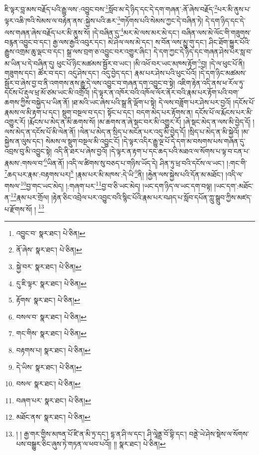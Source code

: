ཇི་ལྟར་བླ་མས་བརྗོད་པའི་རྒྱུ་ལས་:འབྱུང་བས་\footnote{འབྱུང་བ་  སྣར་ཐང་།  པེ་ཅིན། }སློབ་མ་དེ་ཉིད་དང་དེ་དག་གཞན་:ནོ་ཞེས་བརྗོད་\footnote{ནོ་ཞེས་  སྣར་ཐང་།  པེ་ཅིན། }པར་མི་ནུས་པ་ལྟར་འཆི་ཁའི་སེམས་ལ་བརྟེན་ནས་:སྐྱེས་པའི་ཆར་\footnote{སྐྱེ་བར་  སྣར་ཐང་།  པེ་ཅིན། }གཏོགས་པའི་སེམས་ཀྱང་དེ་བཞིན་ཏེ། དེ་དག་ཉིད་དང་དེ་ལས་གཞན་ཞེས་བརྗོད་པར་མི་ནུས་སོ། །དེ་བཞིན་དུ་\footnote{དུ་ཇི་ལྟར་  སྣར་ཐང་།  པེ་ཅིན། }མར་མེ་ལས་མར་མེ་དང་། བཞིན་ལས་མེ་ལོང་གི་གཟུགས་བརྙན་འབྱུང་བ་དང་། རྒྱ་ལས་རྒྱའི་འབུར་དང་། མེ་ཤེལ་ལས་མེ་དང་། ས་བོན་ལས་མྱུ་གུ་དང་། ཤིང་ཐོག་སྐྱུར་པོའི་རྒྱུས་འགྲམ་ཆུ་ལྡང་བ་དང་། སྒྲ་ལས་བྲག་ཅ་འབྱུང་བར་འགྱུར་ཞིང་། དེ་དག་ཀྱང་དེ་ཉིད་དང་གཞན་ཤེས་པར་སླ་བ་མ་ཡིན་པ་དེ་བཞིན་དུ། ཕུང་པོ་ཉིང་མཚམས་སྦྱོར་བ་ཡང་། །མི་འཕོ་བར་ཡང་མཁས་རྟོག་\footnote{རྟོགས་  སྣར་ཐང་།  པེ་ཅིན། }བྱ། །དེ་ལ་ཕུང་པོ་ནི། གཟུགས་དང་། ཚོར་བ་དང་། འདུ་ཤེས་དང་། འདུ་བྱེད་དང་། རྣམ་པར་ཤེས་པའི་ཕུང་པོའོ། །དེ་དག་ཉིང་མཚམས་སྦྱོར་བ་ཞེས་བྱ་བ་ནི་འགགས་ནས་རྒྱུ་དེ་ལས་འབྱུང་བ་གཞན་དག་འབྱུང་བ་སྟེ། འཇིག་རྟེན་འདི་ནས་ཕ་རོལ་ཏུ་དངོས་པོ་རྡུལ་ཕྲ་མོ་ཙམ་ཡང་མི་འགྲོའོ། །དེ་ལྟར་ན་འཁོར་བའི་འཁོལ་ལོར་ནོར་བའི་རྣམ་པར་རྟོག་པའི་བག་ཆགས་ཀྱིས་བསྐྱེད་པ་ཡིན་ནོ། །ཐ་མའི་ཡང་ཞེས་པའི་སྒྲ་ནི་ལྡོག་པ་སྟེ། དེ་ལས་བཟློག་པར་ཤེས་པར་བྱའོ། །དངོས་པོ་རྣམས་ལ་མི་རྟག་པ་དང་། སྡུག་བསྔལ་བ་དང་། སྟོང་པ་དང་། བདག་མེད་པར་རྟོགས་ན། དངོས་པོ་ལ་རྨོངས་པར་མི་འགྱུར་རོ། །རྨོངས་པ་མེད་ན་མི་ཆགས་སོ། །མ་ཆགས་ན་ཞེ་སྡང་བར་མི་འགྱུར་རོ། །ཞེ་སྡང་མེད་ན་ལས་མི་བྱེད་དོ། །ལས་མེད་ན་དངོས་པོ་མི་ལེན་ནོ། །ལེན་པ་མེད་ན་སྲིད་པ་མངོན་པར་འདུ་མི་བྱེད་དོ། །སྲིད་པ་མེད་ན་མི་སྐྱེའོ། །མ་སྐྱེས་ན་ལུས་དང་། སེམས་ལ་སྡུག་བསྔལ་མི་འབྱུང་ངོ། །དེ་ལྟར་འདིར་རྒྱུ་ལྔ་པོ་དེ་དག་མ་བསགས་པས་གཞན་དུ་འབྲས་བུ་མི་འབྱུང་སྟེ། འདི་ནི་ཐར་པ་ཞེས་བྱའོ། །དེ་ལྟར་ན་རྟག་པ་དང་ཆད་པའི་མཐའ་ལ་སོགས་པ་ལྟ་བ་ངན་པ་རྣམས་:གསལ་བ་\footnote{བསལ་བ་  སྣར་ཐང་།  པེ་ཅིན། }ཡིན་ནོ། །འདི་ལ་ཚིགས་སུ་བཅད་པ་གཉིས་ཡོད་དེ། ཤིན་ཏུ་ཕྲ་བའི་དངོས་ལ་ཡང་། །:གང་གི་\footnote{གང་གིས་  སྣར་ཐང་།  པེ་ཅིན། }ཆད་པར་རྣམ་:བརྟགས་པར།\footnote{བརྟགས་པ།  སྣར་ཐང་།  པེ་ཅིན། } །རྣམ་པར་མི་མཁས་:དེ་ཡི་\footnote{དེ་ཡིས་  སྣར་ཐང་།  པེ་ཅིན། }ནི། །རྐྱེན་ལས་སྐྱེས་པའི་དོན་མ་མཐོང་། །འདི་ལ་གསལ་\footnote{བསལ་  སྣར་ཐང་།  པེ་ཅིན། }བྱ་གང་ཡང་མེད། །:གཞག་པར་\footnote{བཞག་པར་  སྣར་ཐང་།  པེ་ཅིན། }བྱ་བ་ཅི་ཡང་མེད། །ཡང་དག་ཉིད་ལ་ཡང་དག་བལྟ། །ཡང་དག་:མཐོང་ན་\footnote{མཐོང་ནས་  སྣར་ཐང་།  པེ་ཅིན། }རྣམ་པར་གྲོལ། །རྟེན་ཅིང་འབྲེལ་པར་འབྱུང་བའི་སྙིང་པོའི་རྣམ་པར་བཤད་པ་སློབ་དཔོན་ཀླུ་སྒྲུབ་ཀྱིས་མཛད་པ་རྫོགས་སོ། ། \footnote{། ། རྒྱ་གར་གྱིས་མཁན་པོ་ཛི་ན་མི་ཏྲ་དང་། དྷ་ན་ཤི་ལ་དང་། ཤི་ལཱེནྡྲ་བོ་བྷི་དང་། བནྡེ་ཡེ་ཤེས་སྡེས་ལ་སོགས་པས་བསྒྱུར་ཅིང་ཞུས་ཏེ་གཏན་ལ་ཕབ་པའོ།། །།  སྣར་ཐང་།  པེ་ཅིན། }